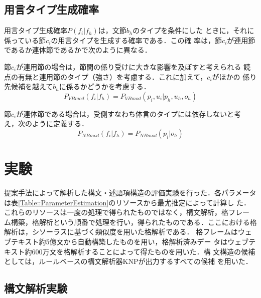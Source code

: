 \documentclass[japanese]{jnlp_1.3e}
\begin{document}
\subsection{用言タイプ生成確率}
\label{Section::付属語列生成確率}

用言タイプ生成確率$P(f_i|f_{h})$は，文節$b_{h}$のタイプを条件にした
ときに，それに係っている節$c_i$の用言タイプを生成する確率である．この確
率は，節$c_i$が連用節であるか連体節であるかで次のように異なる．

節$c_i$が連用節の場合は，節間の係り受けに大きな影響を及ぼすと考えられる
読点の有無と連用節のタイプ（強さ）を考慮する．これに加えて，$c_i$がほかの
係り先候補を越えて$b_{h}$に係るかどうかを考慮する．
\begin{equation}
 P_{\mathit{VBmod}}(f_i|f_{h}) = P_{\mathit{VBmod}}(p_i,u_i|p_{h},u_{h},o_{h})
\end{equation}

節$c_i$が連体節である場合は，受側すなわち体言のタイプには依存しないと考
え，次のように定義する．
\begin{equation}
 P_{\mathit{NBmod}}(f_i|f_{h}) = P_{\mathit{NBmod}}(p_i|o_{h})
\end{equation}



\section{実験}

提案手法によって解析した構文・述語項構造の評価実験を行った．各パラメータ
は表\ref{Table::ParameterEstimation}のリソースから最尤推定によって計算し
た．これらのリソースは一度の処理で得られたものではなく，構文解析，格フレー
ム構築，格解析という順番で処理を行い，得られたものである．ここにおける格
解析は，シソーラスに基づく類似度を用いた格解析\cite{Kawahara2005}である．
格フレームはウェブテキスト約5億文から自動構築したものを用い，格解析済みデー
タはウェブテキスト約600万文を格解析することによって得たものを用いた．構
文構造の候補としては，ルールベースの構文解析器KNPが出力するすべての候補
を用いた．

\begin{table}[b]

\end{table}


\subsection{構文解析実験}
\end{document}
